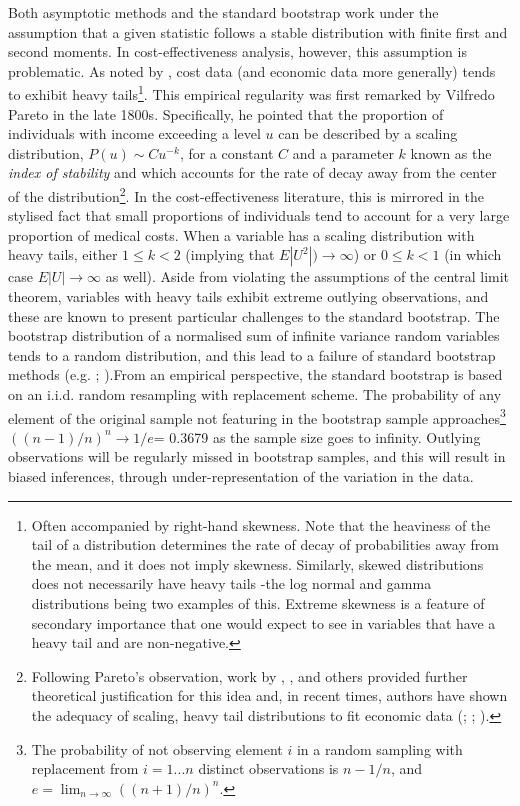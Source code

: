 \documentclass[english, 11pt,a4paper, ]{article}
\begin{document}
Both asymptotic methods and the standard bootstrap work under the assumption that a given statistic follows a stable distribution with finite first and second moments. In  cost-effectiveness analysis, however, this assumption is problematic. As noted by \cite{jonesLomasRice2014jappliedEconometrics}, cost data (and economic data more generally) tends to exhibit  heavy tails\footnote{Often accompanied by right-hand skewness. Note that the heaviness of the tail of a distribution determines the rate of decay of probabilities away from the mean, and it does not imply skewness. Similarly, skewed distributions does not necessarily have heavy tails -the log normal and gamma distributions being two examples of this. Extreme skewness is a feature of secondary importance that one would expect to see in variables that have a heavy tail and are non-negative.}. This empirical regularity was first remarked by Vilfredo Pareto in the late 1800s. Specifically, he pointed that the proportion of individuals with income exceeding a level $u$ can be described by a scaling distribution,  $P(u)\sim Cu^{-k}$, for a constant $C$ and a parameter  $k$ known as the \textit{index of stability} and which accounts for the rate of decay away from the center of the distribution\footnote{Following Pareto's observation, work by \cite{zipf1949book}, \cite{mandelbrot1963jpe}, \cite{singhMaddala1976econometrica} and others provided further theoretical justification for this idea and, in recent times, authors have shown the adequacy of scaling, heavy tail distributions to fit economic data (\citealp{kumar2017internationalJournalSystemAssurance}; \citealp{jenkins2017economica}; \citealp{schluterTrede2002joe}).}. In the cost-effectiveness literature, this is mirrored in the stylised fact that small proportions of individuals tend to account for a very large proportion of medical costs. When a variable has a scaling distribution with heavy tails, either   $1\leq k <2 $ (implying that $E|U^2|)\rightarrow\infty$) or $0\leq k <1 $ (in which case $E|U|\rightarrow\infty$ as well).  Aside from violating the assumptions of the central limit theorem, variables with heavy tails exhibit extreme outlying observations, and these are known to present particular challenges to the standard bootstrap. The bootstrap distribution of a normalised sum of infinite variance random variables tends to a random distribution, and this lead to a failure of standard bootstrap methods (e.g. \citealp{athreya1987aos}; \citealp{hall1990AoProb}).From an empirical perspective,  the standard bootstrap is based on an  i.i.d. random resampling with  replacement scheme. The probability of any element of the original sample not featuring in the bootstrap sample approaches\footnote{The probability of not observing element $i$ in a random sampling with replacement from $i=1... n$ distinct observations is $n-1/n$, and $e=\lim_{n\rightarrow\infty}((n+1)/n)^n$. } $((n-1)/n)^{n}\rightarrow 1/e$= 0.3679 as the sample size goes to infinity. Outlying observations will be regularly missed in bootstrap samples, and this will result in biased inferences, through under-representation of the variation in the data.  
\end{document}
